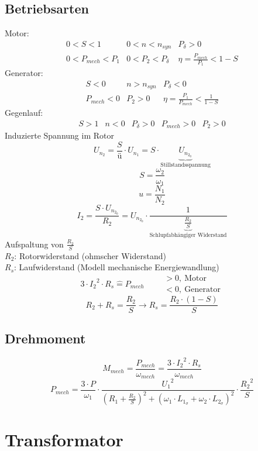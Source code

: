 \subsection{Betriebsarten}
Motor: 
\[ \begin{array}{llllll}
0 < S < 1 
  & 0 < n < n_{syn} 
  & P_\delta > 0 
  \\ 0 < P_{mech} < P_1 
  & 0 < P_2 < P_\delta 
  & \eta = \frac{P_{mech}}{P_1} < 1 - S
\end{array} \]
Generator: 
\[ \begin{array}{llllll}
S < 0 
  & n > n_{syn} 
  & P_\delta < 0 
  \\ P_{mech} < 0 
  & P_2 > 0
  & \eta = \frac{P_1}{P_{mech}} < \frac{1}{1 - S}
\end{array} \]
Gegenlauf: 
\[ \begin{array}{llllll}
S > 1 
  & n < 0
  & P_\delta > 0 
  & P_{mech} > 0
  & P_2 > 0
\end{array} \]
Induzierte Spannung im Rotor
\[ U_{n_2} = \frac{S}{ü} \cdot U_{n_1} = S \cdot \underbrace{U_{n_{2_0}}}_
{\text{Stillstandsspannung}} \]
\[ S = \frac{\omega_2}{\omega_1} \]
\[ u = \frac{N_1}{N_2} \]
\[ I_2 = \frac{S \cdot U_{n_{2_0}}}{R_2} = U_{n_{2_0}} \cdot 
\frac{1}{\underbrace{\frac{R_2}{S}}_{\text{Schlupfabhängiger Widerstand}}} \]
Aufspaltung von $\frac{R_2}{S}$\\
$R_2$: Rotorwiderstand (ohmscher Widerstand)\\
$R_s$: Laufwiderstand (Modell mechanische Energiewandlung)
\[ 3 \cdot {I_2}^2 \cdot R_s \hat{=} P_{mech} 
\qquad \begin{array}{l}>0,~\text{Motor}\\<0,~\text{Generator}\end{array} \]
\[ R_2 + R_s = \frac{R_2}{S} \rightarrow R_s = \frac{R_2 \cdot (1 - S)}{S} \]

\subsection{Drehmoment}
\[ M_{mech} = \frac{P_{mech}}{\omega_{mech}} 
= \frac{3 \cdot {I_2}^2 \cdot R_s}{\omega_{mech}} \]
\[ P_{mech} = \frac{3 \cdot P}{\omega_1} \cdot 
\frac{{U_1}^2}{\left(R_1 + \frac{R_2}{S}\right)^2 + 
(\omega_1 \cdot L_{1_\sigma} + \omega_2 \cdot L_{2_\sigma})^2} \cdot 
\frac{{R_2}^2}{S} \]

\newpage
\section{Transformator}

